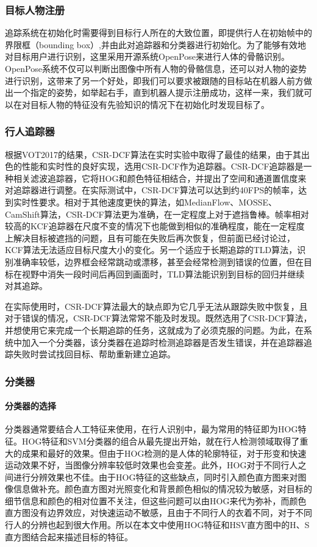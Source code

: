 \subsubsection{目标人物注册}

  追踪系统在初始化时需要得到目标行人所在的大致位置，即提供行人在初始帧中的界限框（bounding box）,并由此对追踪器和分类器进行初始化。为了能够有效地对目标用户进行识别，这里采用开源系统OpenPose\cite{cao2018openpose}来进行人体的骨骼识别。OpenPose系统不仅可以判断出图像中所有人物的骨骼信息，还可以对人物的姿势进行识别，这带来了另一个好处，即我们可以要求被跟随的目标站在机器人前方做出一个指定的姿势，如举起右手，直到机器人提示注册成功，这样一来，我们就可以在对目标人物的特征没有先验知识的情况下在初始化时发现目标了。

\subsubsection{行人追踪器}
  根据VOT2017的结果\cite{kristan2017visual}，CSR-DCF算法在实时实验中取得了最佳的结果，由于其出色的性能和实时性的良好实现，选用CSR-DCF作为追踪器。CSR-DCF追踪器是一种相关滤波追踪器，它将HOG和颜色特征相结合，并提出了空间和通道置信度来对追踪器进行调整。在实际测试中，CSR-DCF算法可以达到约40FPS的帧率，达到实时性要求。相对于其他速度更快的算法，如MedianFlow、MOSSE、CamShift算法，CSR-DCF算法更为准确，在一定程度上对于遮挡鲁棒。帧率相对较高的KCF追踪器在尺度不变的情况下也能做到相似的准确程度，能在一定程度上解决目标被遮挡的问题，且有可能在失败后再次恢复，但前面已经讨论过，KCF算法无法适应目标尺度大小的变化。另一个适应于长期追踪的TLD算法，识别准确率较低，边界框会经常跳动或漂移，甚至会经常检测到错误的位置，但在目标在视野中消失一段时间后再回到画面时，TLD算法能识别到目标的回归并继续对其追踪。

  在实际使用时，CSR-DCF算法最大的缺点即为它几乎无法从跟踪失败中恢复，且对于错误的情况，CSR-DCF算法常常不能及时发现。既然选用了CSR-DCF算法，并想使用它来完成一个长期追踪的任务，这就成为了必须克服的问题。为此，在系统中加入一个分类器，该分类器在追踪时检测追踪器是否发生错误，并在追踪器追踪失败时尝试找回目标、帮助重新建立追踪。

\subsubsection{分类器}
\paragraph{分类器的选择}
  分类器通常要结合人工特征来使用，在行人识别中，最为常用的特征即为HOG特征。HOG特征和SVM分类器的组合从\citet{dalal2005histograms}最先提出开始，就在行人检测领域取得了重大的成果和最好的效果。但由于HOG检测的是人体的轮廓特征，对于形变和快速运动效果不好，当图像分辨率较低时效果也会变差。此外，HOG对于不同行人之间进行分辨效果也不佳。由于HOG特征的这些缺点，同时引入颜色直方图来对图像信息做补充。颜色直方图对光照变化和背景颜色相似的情况较为敏感，对目标的细节信息和颜色的相对位置不关注，但这些问题可以由HOG来代为弥补，而颜色直方图没有边界效应，对快速运动不敏感，且由于不同行人的衣着不同，对于不同行人的分辨也起到很大作用。所以在本文中使用HOG特征和HSV直方图中的H、S直方图结合起来描述目标的特征。

